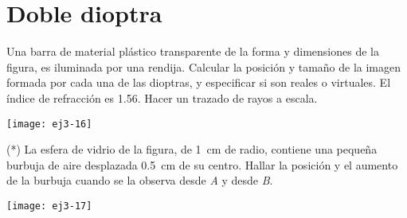 \section*{Doble dioptra}

\item 
\begin{minipage}[t][3cm]{0.55\textwidth}
Una barra de material plástico transparente de la forma y dimensiones de la figura, es iluminada por una rendija.
Calcular la posición y tamaño de la imagen formada por cada una de las dioptras, y especificar si son reales o virtuales.
El índice de refracción es \num{1.56}.
Hacer un trazado de rayos a escala.
\end{minipage}
\begin{minipage}[c][0.4cm][t]{0.4\textwidth}
	\texttt{[image: ej3-16]}
\end{minipage}



\item
\begin{minipage}[t][1.5cm]{0.55\textwidth}
(*) La esfera de vidrio de la figura, de \SI{1}{\centi\metre} de radio, contiene una pequeña burbuja de aire desplazada \SI{0.5}{\centi\metre} de su centro.
Hallar la posición y el aumento de la burbuja cuando se la observa desde \emph{A} y desde \emph{B}.
\end{minipage}
\begin{minipage}[c][0.8cm][t]{0.4\textwidth}
	\texttt{[image: ej3-17]}
\end{minipage}
